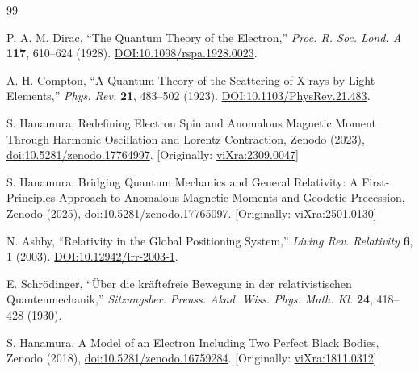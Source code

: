 \documentclass[%
 reprint,
 amsmath,amssymb,
 aps,
]{revtex4-1}
\numberwithin{equation}{section}%
\begin{document}
\begin{thebibliography}{99}


P. A. M. Dirac,
``The Quantum Theory of the Electron,''
\textit{Proc. R. Soc. Lond. A} \textbf{117}, 610--624 (1928).
\href{https://doi.org/10.1098/rspa.1928.0023}{DOI:10.1098/rspa.1928.0023}.

A. H. Compton,
``A Quantum Theory of the Scattering of X-rays by Light Elements,''
\textit{Phys. Rev.} \textbf{21}, 483--502 (1923).
\href{https://doi.org/10.1103/PhysRev.21.483}{DOI:10.1103/PhysRev.21.483}.

S. Hanamura, Redefining Electron Spin and Anomalous Magnetic Moment Through Harmonic Oscillation and Lorentz Contraction, Zenodo (2023), \href{https://doi.org/10.5281/zenodo.17764997}{doi:10.5281/zenodo.17764997}. [Originally: \href{https://vixra.org/abs/2309.0047}{viXra:2309.0047}]

S. Hanamura, Bridging Quantum Mechanics and General Relativity: A First-Principles Approach to Anomalous Magnetic Moments and Geodetic Precession, Zenodo (2025), \href{https://doi.org/10.5281/zenodo.17765097}{doi:10.5281/zenodo.17765097}. [Originally: \href{https://vixra.org/abs/2501.0130}{viXra:2501.0130}]

N. Ashby,
``Relativity in the Global Positioning System,''
\textit{Living Rev. Relativity} \textbf{6}, 1 (2003).
\href{https://doi.org/10.12942/lrr-2003-1}{DOI:10.12942/lrr-2003-1}.

E. Schrödinger,
``Über die kräftefreie Bewegung in der relativistischen Quantenmechanik,''
\textit{Sitzungsber. Preuss. Akad. Wiss. Phys. Math. Kl.} \textbf{24}, 418--428 (1930).

S. Hanamura, A Model of an Electron Including Two Perfect Black Bodies, Zenodo (2018), \href{https://doi.org/10.5281/zenodo.16759284}{doi:10.5281/zenodo.16759284}. [Originally: \href{https://vixra.org/abs/1811.0312}{viXra:1811.0312}]


\end{thebibliography}
\end{document}
